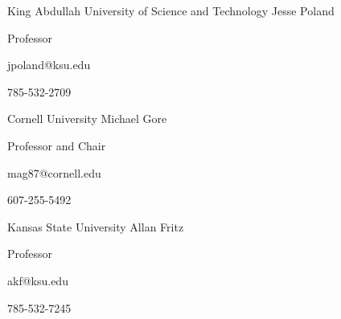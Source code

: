 
\begin{cventries}

  \cventry
    {King Abdullah University of Science and Technology} %
    {Jesse Poland} %
    {} %
    {} %
    {
      \begin{cvitems} %
        \item {Professor}
        \item {jpoland@ksu.edu}
        \item {785-532-2709}
      \end{cvitems}
    }

  \cventry
    {Cornell University} %
    {Michael Gore} %
    {} %
    {} %
    {
      \begin{cvitems} %
        \item {Professor and Chair}
        \item {mag87@cornell.edu}
        \item {607-255-5492}
      \end{cvitems}
    }

  \cventry
    {Kansas State University} %
    {Allan Fritz} %
    {} %
    {} %
    {
      \begin{cvitems} %
        \item {Professor}
        \item {akf@ksu.edu}
        \item {785-532-7245}
      \end{cvitems}
    }



\end{cventries}
